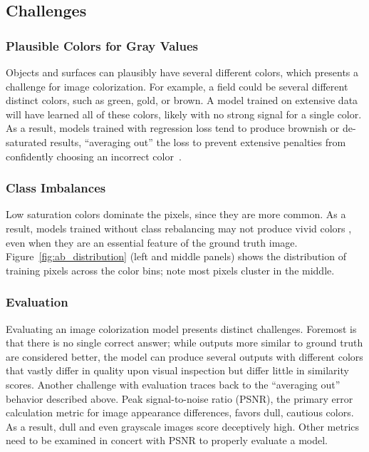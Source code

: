 \documentclass{article}
\begin{document}
\subsection{Challenges}

\subsubsection{Plausible Colors for Gray Values}
Objects and surfaces can plausibly have several different colors, which presents a challenge for image colorization. For example, a field could be several different distinct colors, such as green, gold, or brown. A model trained on extensive data will have learned all of these colors, likely with no strong signal for a single color. As a result, models trained with regression loss tend to produce brownish or de-saturated results, ``averaging out'' the loss to prevent extensive penalties from confidently choosing an incorrect color~\citep{zhang2016colorful}.

\subsubsection{Class Imbalances}
Low saturation colors dominate the pixels, since they are more common. As a result, models trained without class rebalancing may not produce vivid colors \citep{zhang2016colorful}, even when they are an essential feature of the ground truth image. Figure~\ref{fig:ab_distribution} (left and middle panels) shows the distribution of training pixels across the color bins; note most pixels cluster in the middle.
 
\subsubsection{Evaluation}
Evaluating an image colorization model presents distinct challenges. Foremost is that there is no single correct answer; while outputs more similar to ground truth are considered better, the model can produce several outputs with different colors that vastly differ in quality upon visual inspection but differ little in similarity scores. Another challenge with evaluation traces back to the ``averaging out'' behavior described above. Peak signal-to-noise ratio (PSNR), the primary error calculation metric for image appearance differences, favors dull, cautious colors. As a result, dull and even grayscale images score deceptively high. Other metrics need to be examined in concert with PSNR to properly evaluate a model.
\end{document}
